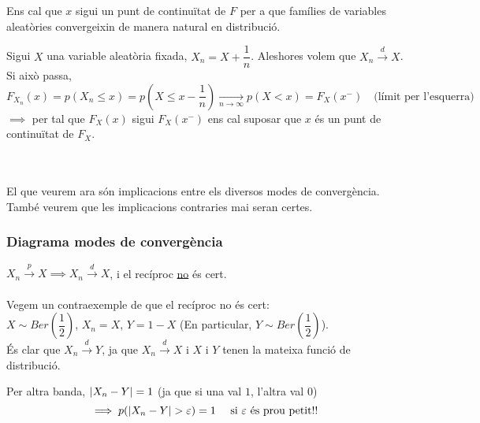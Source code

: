 \begin{obs}
  Ens cal que $x$ sigui un punt de continuïtat de $F$ per a que famílies de variables aleatòries convergeixin de manera natural en distribució.
\end{obs}

\newpage

\begin{example}
  Sigui $X$ una variable aleatòria fixada, $X_n = X + \dfrac{1}{n}$. Aleshores volem que $X_n \overset{d}{\longrightarrow} X$. Si això passa, 
  \[
    F_{X_n}(x) = p(X_n \leq x) = p(X \leq x -\frac{1}{n}) \underset{n\to \infty}{\longrightarrow}p(X<x) = F_X(x^-) \quad \text{(límit per l'esquerra)}
  \]
  $\implies$ per tal que $F_X(x)$ sigui $F_X(x^-)$ ens cal suposar que $x$ és un punt de continuïtat de $F_X$.
\end{example}
\-\\\\
El que veurem ara  són implicacions entre els diversos modes de convergència. \\
També veurem que les implicacions contraries mai seran certes.

\subsubsection{Diagrama modes de convergència}


\begin{prop}[(I)]
  $X_n \overset{p}{\to} X \implies X_n \overset{d}{\to} X$, i el recíproc \underline{no} és cert. \\\\
  
  Vegem un contraexemple de que el recíproc no és cert: \\
  
  $X \sim Ber(\dfrac{1}{2})$, $X_n = X$, $Y = 1-X$ (En particular, $Y\sim Ber(\dfrac{1}{2})$). \\
  
  És clar que $X_n \overset{d}{\to} Y$, ja que $X_n \overset{d}{\to} X$ i $X$ i $Y$ tenen la mateixa funció de distribució.
  
  Per altra banda, $\left\vert X_n - Y \right\vert = 1$ (ja que si una val $1$, l'altra val $0$)
  $$\implies p(\left\vert X_n-Y \right\vert > \varepsilon) = 1 \quad \text{ si } \varepsilon \text{ és prou petit!!}$$
\end{prop}

